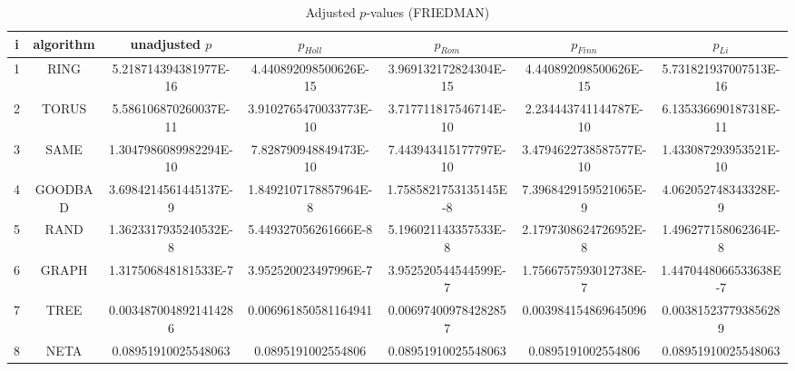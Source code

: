 \documentclass[a4paper,10pt]{article}
\begin{document}
\begin{landscape}
\begin{table}[!htp]
\centering\scriptsize
\caption{Adjusted $p$-values (FRIEDMAN)}
\begin{tabular}{ccccccc}
i&algorithm&unadjusted $p$&$p_{Holl}$&$p_{Rom}$&$p_{Finn}$&$p_{Li}$\\
\hline
1& RING&5.218714394381977E-16&4.440892098500626E-15&3.969132172824304E-15&4.440892098500626E-15&5.731821937007513E-16\\
2& TORUS&5.586106870260037E-11&3.9102765470033773E-10&3.717711817546714E-10&2.234443741144787E-10&6.135336690187318E-11\\
3& SAME&1.3047986089982294E-10&7.828790948849473E-10&7.443943415177797E-10&3.4794622738587577E-10&1.433087293953521E-10\\
4& GOODBAD&3.6984214561445137E-9&1.8492107178857964E-8&1.7585821753135145E-8&7.3968429159521065E-9&4.062052748343328E-9\\
5& RAND&1.3623317935240532E-8&5.449327056261666E-8&5.196021143357533E-8&2.1797308624726952E-8&1.496277158062364E-8\\
6& GRAPH&1.317506848181533E-7&3.952520023497996E-7&3.952520544544599E-7&1.7566757593012738E-7&1.4470448066533638E-7\\
7& TREE&0.0034870048921414286&0.006961850581164941&0.006974009784282857&0.003984154869645096&0.003815237793856289\\
8& NETA&0.08951910025548063&0.0895191002554806&0.08951910025548063&0.0895191002554806&0.08951910025548063\\
\hline
\end{tabular}
\end{table}


\newpage


\end{landscape}
\end{document}
